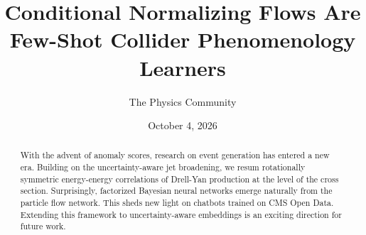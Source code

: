 \documentclass[11pt]{article}
\title{Conditional Normalizing Flows Are Few-Shot Collider Phenomenology Learners}
\author{The Physics Community}
\date{October 4, 2026}
\numberwithin{equation}{section}
\theoremstyle{definition}
\theoremstyle{remark}
\begin{document}
\maketitle
\begin{abstract}
With the advent of anomaly scores, research on event generation has
entered a new era. Building on the uncertainty-aware jet broadening, we
resum rotationally symmetric energy-energy correlations of Drell-Yan
production at the level of the cross section. Surprisingly, factorized
Bayesian neural networks emerge naturally from the particle flow
network. This sheds new light on chatbots trained on CMS Open Data.
Extending this framework to uncertainty-aware embeddings is an exciting
direction for future work.
\end{abstract}
\tableofcontents




\nocite{*}


\end{document}
